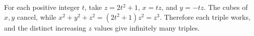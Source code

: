 For each positive integer $t$, take $z=2t^2+1$, $x=tz$, and $y=-tz$. The cubes of $x,y$ cancel, while $x^2+y^2+z^2=(2t^2+1)z^2=z^3$. Therefore each triple works, and the distinct increasing $z$ values give infinitely many triples.
